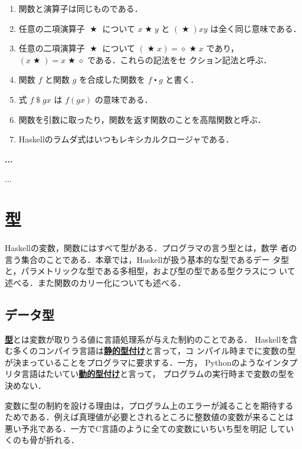 \documentclass[a5paper,twoside,fleqn]{jsbook}
\newcommand{\programminglanguage}[1]{\textsf{#1}}
\newcommand{\clang}{\programminglanguage{C}}
\newcommand{\haskell}{\programminglanguage{Haskell}}
\newcommand{\python}{\programminglanguage{Python}}
\newenvironment{leader}{\begingroup\gt}{\endgroup}
\newenvironment{note}[1]{\begin{boxnote}\begin{center}\textbf{#1}\end{center}}{\end{boxnote}}
\newcommand{\keyword}[1]{{\underline{\textbf{#1}}}}
\newcommand{\mAnonParam}{\diamond}
\DeclareMathOperator{\mApply}{\$}
\DeclareMathOperator{\mBinOp}{\bigstar}
\DeclareMathOperator{\mComp}{\centerdot}
\begin{document}
\begin{enumerate}
\item 関数と演算子は同じものである．\item 任意の二項演算子 $\mBinOp$
  について $x\mBinOp y$ と $(\mBinOp)xy$ は全く同じ意味である．\item
  任意の二項演算子 $\mBinOp$ について $(\mBinOp x)=\mAnonParam\mBinOp
  x$ であり，$(x\mBinOp)=x\mBinOp\mAnonParam$ である．これらの記法をセ
  クション記法と呼ぶ．\item 関数 $f$ と関数 $g$ を合成した関数を
  $f\mComp g$ と書く．\item 式 $f\mApply gx$ は $f(gx)$ の意味である．
\item 関数を引数に取ったり，関数を返す関数のことを高階関数と呼ぶ．
\item \haskell のラムダ式はいつもレキシカルクロージャである．
\end{enumerate}

\begin{note}{...}
...
\end{note}

\chapter{型}
\label{ch:type}

\begin{leader}
\haskell の変数，関数にはすべて型がある．プログラマの言う型とは，数学
者の言う集合のことである．本章では，\haskell が扱う基本的な型であるデー
タ型と，パラメトリックな型である多相型，および型の型である型クラスにつ
いて述べる．また関数のカリー化についても述べる．
\end{leader}

\section{データ型}

\keyword{型}とは変数が取りうる値に言語処理系が与えた制約のことである．
\haskell を含む多くのコンパイラ言語は\keyword{静的型付け}と言って，コ
ンパイル時までに変数の型が決まっていることをプログラマに要求する．一方，
\python のようなインタプリタ言語はたいてい\keyword{動的型付け}と言って，
プログラムの実行時まで変数の型を決めない．

変数に型の制約を設ける理由は，プログラム上のエラーが減ることを期待する
ためである．例えば真理値が必要とされるところに整数値の変数が来ることは
悪い予兆である．一方で\clang 言語のように全ての変数にいちいち型を明記
していくのも骨が折れる．
\end{document}
